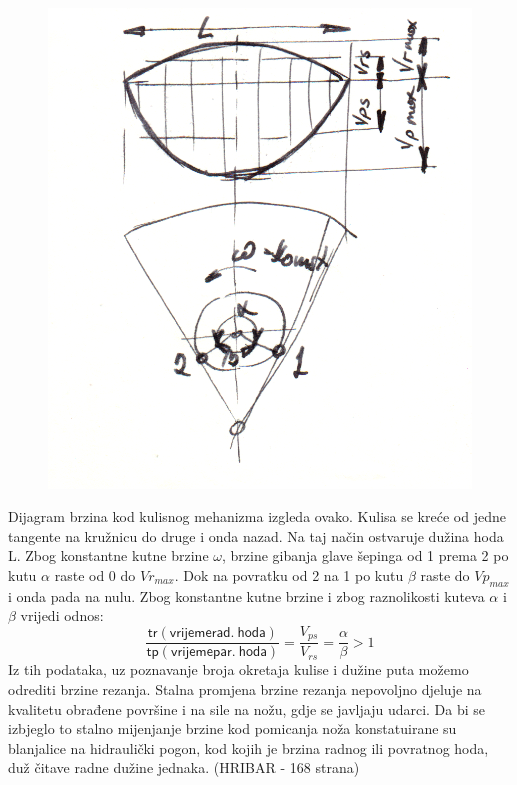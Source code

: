 \documentclass[a4paper,12pt]{article}
\numberwithin{figure}{section}
\begin{document}
\begin{figure}[!h]
\centering
\includegraphics[scale=0.12]{image_15-2.png}
\end{figure}
\FloatBarrier
Dijagram brzina kod kulisnog mehanizma izgleda ovako. Kulisa se kreće od jedne tangente na kružnicu do druge i onda nazad. Na taj način ostvaruje dužina hoda L. Zbog konstantne kutne brzine $\omega$, brzine gibanja glave šepinga od 1 prema 2 po kutu $\alpha$ raste od 0 do $Vr_{max}$. Dok na povratku od 2 na 1 po kutu $\beta$ raste do $Vp_{max}$ i onda pada na nulu. Zbog konstantne kutne brzine i zbog raznolikosti kuteva $\alpha$ i $\beta$ vrijedi odnos:
\begin{equation}
\frac{\mathsf{tr(vrijeme rad.\:hoda)}}{\mathsf{tp(vrijeme par.\:hoda)}} = \frac{V_{ps}}{V_{rs}} = \frac{\alpha}{\beta}>1
\end{equation}
Iz tih podataka, uz poznavanje broja okretaja kulise i dužine puta možemo odrediti brzine rezanja. Stalna promjena brzine rezanja nepovoljno djeluje na kvalitetu obrađene površine i na sile na nožu, gdje se javljaju udarci. Da bi se izbjeglo to stalno mijenjanje brzine kod pomicanja noža konstatuirane su blanjalice na hidraulički pogon, kod kojih je brzina radnog ili povratnog hoda, duž čitave radne dužine jednaka. (HRIBAR - 168 strana)
\end{document}
